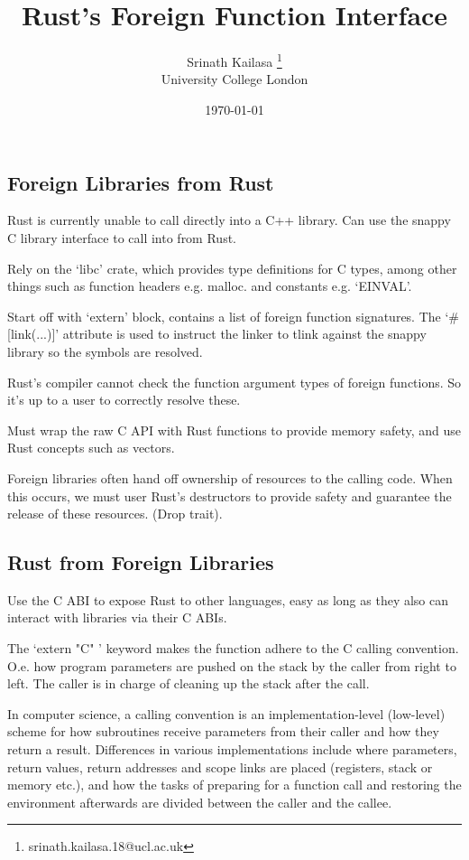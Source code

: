 \documentclass[12pt, a4, twoside]{article}
\title{Rust's Foreign Function Interface}
\author{Srinath Kailasa \thanks{srinath.kailasa.18@ucl.ac.uk} \\ \small University College London}
\date{\today}
\begin{document}
\maketitle

\subsection*{Foreign Libraries from Rust}

Rust is currently unable to call directly into a C++ library. Can use the snappy C library interface to call into from Rust.

Rely on the `libc' crate, which provides type definitions for C types, among other things such as function headers e.g. malloc. and constants e.g. `EINVAL'.

Start off with `extern' block, contains a list of foreign function signatures. The `\#[link(...)]' attribute is used to instruct the linker to tlink against the snappy library so the symbols are resolved.

Rust's compiler cannot check the function argument types of foreign functions. So it's up to a user to correctly resolve these.

Must wrap the raw C API with Rust functions to provide memory safety, and use Rust concepts such as vectors.

Foreign libraries often hand off ownership of resources to the calling code. When this occurs, we must user Rust's destructors to provide safety and guarantee the release of these resources. (Drop trait).

\subsection*{Rust from Foreign Libraries}

Use the C ABI to expose Rust to other languages, easy as long as they also can interact with libraries via their C ABIs.

The `extern "C" ' keyword makes the function adhere to the C calling convention. O.e. how program parameters are pushed on the stack by the caller from right to left. The caller is in charge of cleaning up the stack after the call. 

In computer science, a calling convention is an implementation-level (low-level) scheme for how subroutines receive parameters from their caller and how they return a result. Differences in various implementations include where parameters, return values, return addresses and scope links are placed (registers, stack or memory etc.), and how the tasks of preparing for a function call and restoring the environment afterwards are divided between the caller and the callee.
\end{document}

